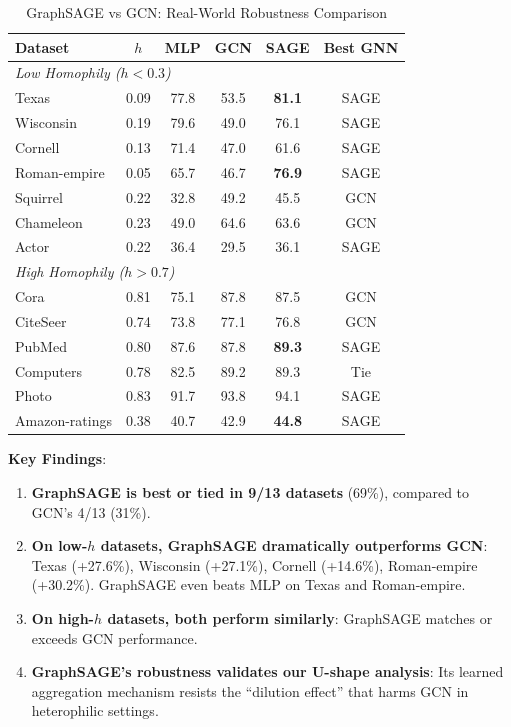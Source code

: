 \begin{table}[t]
\centering
\caption{GraphSAGE vs GCN: Real-World Robustness Comparison}
\label{tab:graphsage_validation}
\small
\begin{tabular}{@{}lccccc@{}}
\toprule
\textbf{Dataset} & \textbf{$h$} & \textbf{MLP} & \textbf{GCN} & \textbf{SAGE} & \textbf{Best GNN} \\
\midrule
\multicolumn{6}{l}{\textit{Low Homophily ($h < 0.3$)}} \\
Texas & 0.09 & 77.8 & 53.5 & \textbf{81.1} & SAGE \\
Wisconsin & 0.19 & 79.6 & 49.0 & 76.1 & SAGE \\
Cornell & 0.13 & 71.4 & 47.0 & 61.6 & SAGE \\
Roman-empire & 0.05 & 65.7 & 46.7 & \textbf{76.9} & SAGE \\
Squirrel & 0.22 & 32.8 & 49.2 & 45.5 & GCN \\
Chameleon & 0.23 & 49.0 & 64.6 & 63.6 & GCN \\
Actor & 0.22 & 36.4 & 29.5 & 36.1 & SAGE \\
\midrule
\multicolumn{6}{l}{\textit{High Homophily ($h > 0.7$)}} \\
Cora & 0.81 & 75.1 & 87.8 & 87.5 & GCN \\
CiteSeer & 0.74 & 73.8 & 77.1 & 76.8 & GCN \\
PubMed & 0.80 & 87.6 & 87.8 & \textbf{89.3} & SAGE \\
Computers & 0.78 & 82.5 & 89.2 & 89.3 & Tie \\
Photo & 0.83 & 91.7 & 93.8 & 94.1 & SAGE \\
Amazon-ratings & 0.38 & 40.7 & 42.9 & \textbf{44.8} & SAGE \\
\bottomrule
\end{tabular}
\end{table}

\textbf{Key Findings}:
\begin{enumerate}
    \item \textbf{GraphSAGE is best or tied in 9/13 datasets} (69\%), compared to GCN's 4/13 (31\%).
    \item \textbf{On low-$h$ datasets, GraphSAGE dramatically outperforms GCN}: Texas (+27.6\%), Wisconsin (+27.1\%), Cornell (+14.6\%), Roman-empire (+30.2\%). GraphSAGE even beats MLP on Texas and Roman-empire.
    \item \textbf{On high-$h$ datasets, both perform similarly}: GraphSAGE matches or exceeds GCN performance.
    \item \textbf{GraphSAGE's robustness validates our U-shape analysis}: Its learned aggregation mechanism resists the ``dilution effect'' that harms GCN in heterophilic settings.
\end{enumerate}


